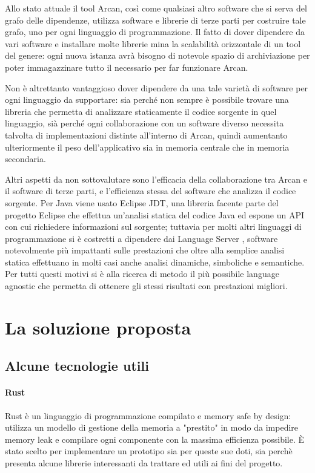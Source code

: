 Allo stato attuale il tool Arcan, cos\`i come qualsiasi altro software che si serva del grafo delle dipendenze, utilizza software e librerie di terze parti per costruire tale grafo, uno per ogni linguaggio di programmazione. Il fatto di dover dipendere da vari software e installare molte librerie mina la scalabilit\`a orizzontale di un tool del genere: ogni nuova istanza avr\`a bisogno di notevole spazio di archiviazione per poter immagazzinare tutto il necessario per far funzionare Arcan.

Non \`e altrettanto vantaggioso dover dipendere da una tale variet\`a di software per ogni linguaggio da supportare: sia perch\'e non sempre \`e possibile trovare una libreria che permetta di analizzare staticamente il codice sorgente in quel linguaggio, si\`a perch\'e ogni collaborazione con un software diverso necessita talvolta di implementazioni distinte all'interno di Arcan, quindi aumentanto ulteriormente il peso dell'applicativo sia in memoria centrale che in memoria secondaria.

Altri aspetti da non sottovalutare sono l'efficacia della collaborazione tra Arcan e il software di terze parti, e l'efficienza stessa del software che analizza il codice sorgente. Per Java viene usato Eclipse JDT, una libreria facente parte del progetto Eclipse che effettua un'analisi statica del codice Java ed espone un API con cui richiedere informazioni sul sorgente; tuttavia per molti altri linguaggi di programmazione si \`e costretti a dipendere dai Language Server \cite{LanguageServer}, software notevolmente pi\`u impattanti sulle prestazioni che oltre alla semplice analisi statica effettuano in molti casi anche analisi dinamiche, simboliche e semantiche. Per tutti questi motivi si \`e alla ricerca di metodo il pi\`u possibile language agnostic che permetta di ottenere gli stessi risultati con prestazioni migliori.

\section{La soluzione proposta}
\subsection{Alcune tecnologie utili}

\paragraph{Rust}

Rust \cite{blandy2017programming} \`e un linguaggio di programmazione compilato e memory safe by design: utilizza un modello di gestione della memoria a "prestito" in modo da impedire memory leak e compilare ogni componente con la massima efficienza possibile. \`E stato scelto per implementare un prototipo sia per queste sue doti, sia perch\`e presenta alcune librerie interessanti da trattare ed utili ai fini del progetto.

